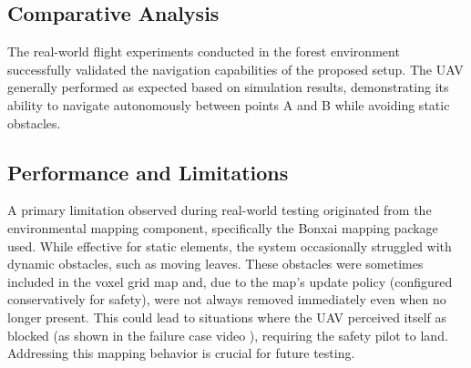         \subsection{Comparative Analysis}
            The real-world flight experiments conducted in the forest environment successfully validated the navigation capabilities of the proposed setup.
            The \ac{UAV} generally performed as expected based on simulation results, demonstrating its ability to navigate autonomously between points A and B while avoiding static obstacles.

            \subsection{Performance and Limitations}
                A primary limitation observed during real-world testing originated from the environmental mapping component, specifically the Bonxai mapping package used.
                While effective for static elements, the system occasionally struggled with dynamic obstacles, such as moving leaves.
                These obstacles were sometimes included in the voxel grid map and, due to the map's update policy (configured conservatively for safety), were not always removed immediately even when no longer present. 
                This could lead to situations where the \ac{UAV} perceived itself as blocked (as shown in the failure case video \cite{flight_fail}), requiring the safety pilot to land. 
                Addressing this mapping behavior is crucial for future testing.

